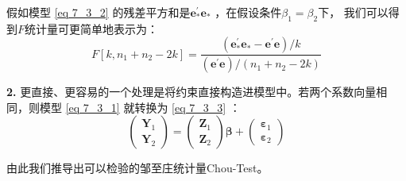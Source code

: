 		假如模型 \ref{eq 7_3_2} 的残差平方和是$ \boldsymbol{e}_{*}^{\prime} \boldsymbol{e}_{*} $ ，在假设条件$ \beta_{1}=\beta_{2} $下， 我们可以得到$ F $统计量可更简单地表示为：
		$$ F\left[k, n_{1}+n_{2}-2 k\right]=\frac{\left ( \boldsymbol{e}_{*}^{\prime} \boldsymbol{e}_{*}-\boldsymbol{e}^{\prime} \boldsymbol{e} \right )/k }{\left ( \boldsymbol{e}^{\prime} \boldsymbol{e}  \right )/\left ( n_{1}+n_{2}-2k \right ) } $$

		{\bf{2.}} 更直接、更容易的一个处理是将约束直接构造进模型中。若两个系数向量相同，则模型 \ref{eq 7_3_1} 就转换为 \ref{eq 7_3_3} ：
		\begin{equation}
			\left(\begin{array}{c}
				\boldsymbol{Y}_{1} \\
				\boldsymbol{Y}_{2}
			\end{array}\right)=\left(\begin{array}{c}
				\boldsymbol{Z}_{1} \\
				\boldsymbol{Z}_{2}
			\end{array}\right) \boldsymbol{\beta}+\left(\begin{array}{c}
				\boldsymbol{\varepsilon}_{1} \\
				\boldsymbol{\varepsilon}_{2}
			\end{array}\right)
			\label{eq 7_3_3}
		\end{equation}	

		由此我们推导出可以检验的邹至庄统计量Chou-Test。
		
